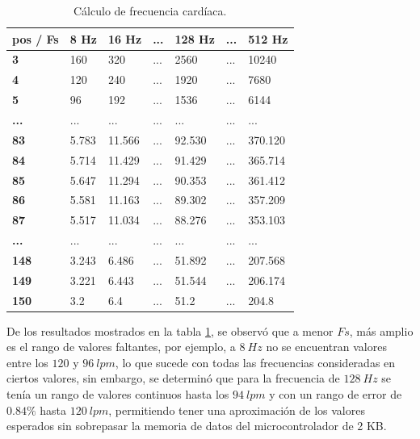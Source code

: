 \documentclass[journal]{IEEEtran}
\begin{document}
\begin{table}[htbp!]
	\begin{center}
		\begin{tabular}{|l|l|l|l|l|l|l|}
			\hline
			\textbf{pos / Fs} & \textbf{8 Hz} & \textbf{16 Hz} & \textbf{...} & \textbf{128 Hz} & \textbf{...} & \textbf{512 Hz} \\
			\hline \hline
			\textbf{3} & 160 & 320 & ... & 2560 & ... & 10240 \\
			\hline
			\textbf{4} & 120 & 240 & ... & 1920 & ... & 7680 \\
			\hline
			\textbf{5} & 96 & 192 & ... & 1536 & ... & 6144 \\
			\hline
			\textbf{...} & ... & ... & ... & ... & ... & ...  \\
			\hline
			\textbf{83} & 5.783 & 11.566 & ... & 92.530 & ... & 370.120 \\
			\hline
			\textbf{84} & 5.714 & 11.429 & ... & 91.429 & ... & 365.714 \\
			\hline
			\textbf{85} & 5.647 & 11.294 & ... & 90.353 & ... & 361.412 \\
			\hline
			\textbf{86} & 5.581 & 11.163 & ... & 89.302 & ... & 357.209 \\
			\hline
			\textbf{87} & 5.517 & 11.034 & ... & 88.276 & ... & 353.103 \\
			\hline
			\textbf{...} & ... & ... & ... & ... & ... & ...  \\
			\hline
			\textbf{148} & 3.243 & 6.486 & ... & 51.892 & ... & 207.568 \\
			\hline
			\textbf{149} & 3.221 & 6.443 & ... & 51.544 & ... & 206.174 \\
			\hline
			\textbf{150} & 3.2 & 6.4 & ... & 51.2 & ... & 204.8 \\
			\hline
		\end{tabular}
		\caption{Cálculo de frecuencia cardíaca.}
		\label{sensorPulso:resultadosCalculoFs}
	\end{center}
\end{table}

De los resultados mostrados en la tabla  \ref{sensorPulso:resultadosCalculoFs}, se observó que a menor $Fs$, más amplio es el rango de valores faltantes, por ejemplo, a $8\ Hz$ no se encuentran valores entre los $120$ y $96\ lpm$, lo que sucede con todas las frecuencias consideradas en ciertos valores, sin embargo, se determinó que para la frecuencia de $128\ Hz$ se tenía un rango de valores continuos hasta los $94\ lpm$ y con un rango de error de $0.84\%$ hasta $120\ lpm$, permitiendo tener una aproximación de los valores esperados sin sobrepasar la memoria de datos del microcontrolador de 2 KB. \\
\end{document}
